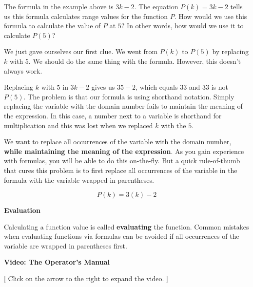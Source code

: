 \documentclass{ximera}
\begin{document}
The formula in the example above is $3k - 2$.  The equation $P(k) = 3k - 2$ tells us this formula calculates range values for the function $P$.  How would we use this formula to calculate the value of $P$ at $5$?   In other words, how would we use it to calculate $P(5)$?

We just gave ourselves our first clue. We went from $P(k)$ to $P(5)$ by replacing $k$ with $5$.  We should do the same thing with the formula. However, this doesn't always work.






Replacing $k$ with $5$ in $3k - 2$ gives us $35-2$, which equals $33$ and $33$ is not $P(5)$. The problem is that our formula is using shorthand notation. Simply replacing the variable with the domain number fails to maintain the meaning of the expression.  In this case, a number next to a variable is shorthand for multiplication and this was lost when we replaced $k$ with the $5$.

We want to replace all occurrences of the variable with the domain number, \textbf{\textcolor{purple!85!blue}{while maintaining the meaning of the expression}}.  As you gain experience with formulas, you will be able to do this on-the-fly.  But a quick rule-of-thumb that cures this problem is to first replace all occurrences of the variable in the formula with the variable wrapped in parentheses.



\[  P(k) = 3(k) - 2  \]




\begin{procedure} \textbf{\textcolor{purple!30!blue}{Evaluation}}   

Calculating a function value is called \textbf{evaluating} the function.  Common mistakes when evaluating functions via formulas can be avoided if all occurrences of the variable are wrapped in parentheses first.
\end{procedure}








\begin{explanation} \textbf{\textcolor{red!75!green}{Video: The Operator's Manual}}

[ Click on the arrow to the right to expand the video. ]
\begin{expandable} 

\begin{center}
\end{center}

\end{expandable}
\end{explanation}
\end{document}
